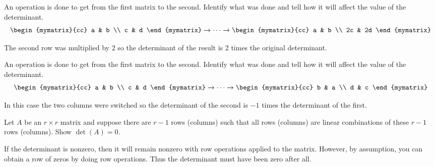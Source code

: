 \begin{enumialphparenastyle}
\begin{ex} An operation is done to get from the first matrix to the second.
Identify what was done and tell how it will affect the value of the
determinant. 
\begin{equation*}
\begin{mymatrix}{cc}
a & b \\
c & d
\end{mymatrix} \rightarrow \cdots \rightarrow \begin{mymatrix}{cc}
a & b \\
2c & 2d
\end{mymatrix}
\end{equation*}
\begin{sol}
The second row was multiplied by 2 so the determinant of the result is 2
times the original determinant.
\end{sol}
\end{ex}

\begin{ex} An operation is done to get from the first matrix to the second.
Identify what was done and tell how it will affect the value of the
determinant. 
\begin{equation*}
\begin{mymatrix}{cc}
a & b \\
c & d
\end{mymatrix} \rightarrow \cdots \rightarrow \begin{mymatrix}{cc}
b & a \\
d & c
\end{mymatrix}
\end{equation*}
\begin{sol}
In this case the two columns were switched so the determinant of the second
is $-1$ times the determinant of the first.
\end{sol}
\end{ex}


\begin{ex} Let $A$ be an $r\times r$ matrix and suppose there are $r-1$ rows
(columns) such that all rows (columns) are linear combinations of these $r-1$
rows (columns). Show $\det \left( A\right) =0.$ 
\begin{sol}
If the determinant is nonzero, then it will remain nonzero with row operations applied to the matrix.
However, by assumption, you can obtain a row of zeros by doing row
operations. Thus the determinant must have been zero after all.
\end{sol}
\end{ex}


\end{enumialphparenastyle}
